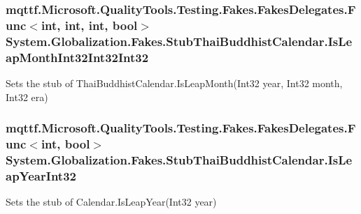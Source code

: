 \hypertarget{class_system_1_1_globalization_1_1_fakes_1_1_stub_thai_buddhist_calendar_adee70aee2aa5474b3549e1724683bc03}{
\subsubsection[{Is\-Leap\-Month\-Int32\-Int32\-Int32}]{\setlength{\rightskip}{0pt plus 5cm}mqttf.\-Microsoft.\-Quality\-Tools.\-Testing.\-Fakes.\-Fakes\-Delegates.\-Func$<$int, int, int, bool$>$ System.\-Globalization.\-Fakes.\-Stub\-Thai\-Buddhist\-Calendar.\-Is\-Leap\-Month\-Int32\-Int32\-Int32}}\label{class_system_1_1_globalization_1_1_fakes_1_1_stub_thai_buddhist_calendar_adee70aee2aa5474b3549e1724683bc03}


Sets the stub of Thai\-Buddhist\-Calendar.\-Is\-Leap\-Month(\-Int32 year, Int32 month, Int32 era)

\hypertarget{class_system_1_1_globalization_1_1_fakes_1_1_stub_thai_buddhist_calendar_a93c8706097c5abb5438d6a90055fa937}{
\subsubsection[{Is\-Leap\-Year\-Int32}]{\setlength{\rightskip}{0pt plus 5cm}mqttf.\-Microsoft.\-Quality\-Tools.\-Testing.\-Fakes.\-Fakes\-Delegates.\-Func$<$int, bool$>$ System.\-Globalization.\-Fakes.\-Stub\-Thai\-Buddhist\-Calendar.\-Is\-Leap\-Year\-Int32}}\label{class_system_1_1_globalization_1_1_fakes_1_1_stub_thai_buddhist_calendar_a93c8706097c5abb5438d6a90055fa937}


Sets the stub of Calendar.\-Is\-Leap\-Year(\-Int32 year)

